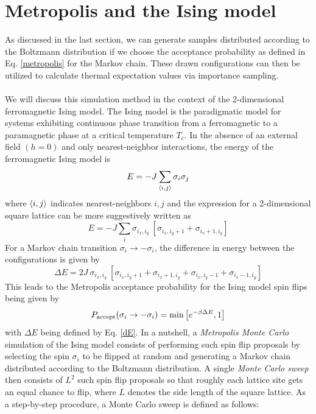 \documentclass[../thesis_main.tex]{subfiles}
\begin{document}
\section{Metropolis and the Ising model}
As discussed in the last section, we can generate samples distributed according to the Boltzmann distribution if we choose the acceptance probability as defined in Eq. \eqref{metropolis} for the Markov chain. These drawn configurations can then be utilized to calculate thermal expectation values via importance sampling.~\\~\\
We will discuss this simulation method in the context of the 2-dimensional ferromagnetic Ising model. The Ising model is the paradigmatic model for systems exhibiting continuous phase transition from a ferromagnetic to a paramagnetic phase at a critical temperature $T_c$. In the absence of an external field $(h=0)$ and only nearest-neighbor interactions, the energy of the ferromagnetic Ising model is 
\begin{equation}
    E = -J \sum_{\expval{i, j}} \sigma_i \sigma_j
    \label{ising}
\end{equation}
where $\expval{i, j}$ indicates nearest-neighbors $i, j$ and the expression for a 2-dimensional square lattice can be more suggestively written as 
\begin{equation}
    E  = -J \sum_{i} \sigma_{i_x, i_y}  \: [\sigma_{i_x, i_y + 1} + \sigma_{i_x + 1, i_y}]
\end{equation}   
For a Markov chain transition $\sigma_i \to - \sigma_i$, the difference in energy between the configurations is given by 
\begin{equation}
    \Delta E = 2J \: \sigma_{i_x, i_y} \: [\sigma_{i_x, i_y + 1} + \sigma_{i_x + 1, i_y} + \sigma_{i_x, i_y - 1} + \sigma_{i_x - 1 , i_y}]
    \label{dE}
\end{equation}
This leads to the Metropolis acceptance probability for the Ising model spin flips being given by
\begin{equation}
    P_\text{accept}(\sigma_i \to -\sigma_i) = \min \qty[e^{-\beta \Delta E}, 1]
    \label{metropolis_ising}
\end{equation}
with $\Delta E$ being defined by Eq. \eqref{dE}. In a nutshell, a \textit{Metropolis Monte Carlo} simulation of the Ising model consists of performing such spin flip proposals by selecting the spin $\sigma_i$ to be flipped at random and generating a Markov chain distributed according to the Boltzmann distribution. A single \textit{Monte Carlo sweep} then consists of $L^2$ such spin flip proposals so that roughly each lattice site gets an equal chance to flip, where $L$ denotes the side length of the square lattice. As a step-by-step procedure, a Monte Carlo sweep is defined as follows:
\end{document}
